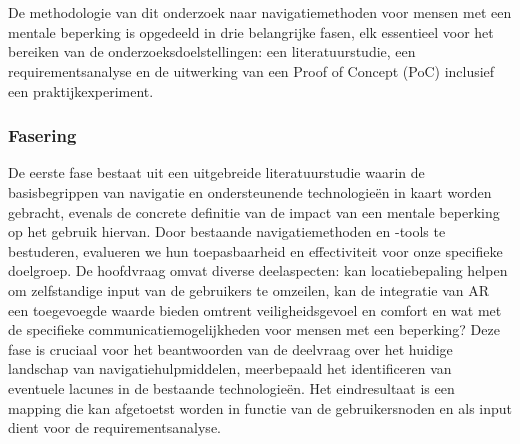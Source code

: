 
\chapter{}%
\label{ch:methodologie}


De methodologie van dit onderzoek naar navigatiemethoden voor mensen met een mentale beperking is opgedeeld in drie belangrijke fasen, elk essentieel voor het bereiken van de onderzoeksdoelstellingen: een literatuurstudie, een requirementsanalyse en de uitwerking van een Proof of Concept (PoC) inclusief een praktijkexperiment.\newline

\subsection*{Fasering}
De eerste fase bestaat uit een uitgebreide literatuurstudie waarin de basisbegrippen van navigatie en ondersteunende technologieën in kaart worden gebracht, evenals de concrete definitie van de impact van een mentale beperking op het gebruik hiervan.  Door bestaande navigatiemethoden en -tools te bestuderen, evalueren we hun toepasbaarheid en effectiviteit voor onze specifieke doelgroep. De hoofdvraag omvat diverse deelaspecten: kan locatiebepaling helpen om zelfstandige input van de gebruikers te omzeilen, kan de integratie van AR een toegevoegde waarde bieden omtrent veiligheidsgevoel en comfort en wat met de specifieke communicatiemogelijkheden voor mensen met een beperking? Deze fase is cruciaal voor het beantwoorden van de deelvraag over het huidige landschap van navigatiehulpmiddelen, meerbepaald het identificeren van eventuele lacunes in de bestaande technologieën. Het eindresultaat is een mapping die kan afgetoetst worden in functie van de gebruikersnoden en als input dient voor de requirementsanalyse.

